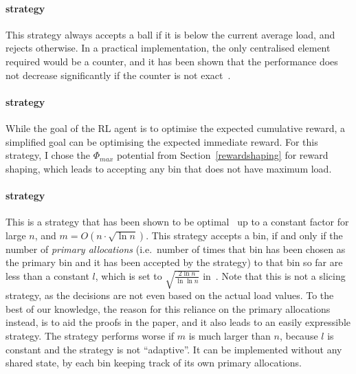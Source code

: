 \paragraph{\MeanThinning strategy}
This strategy always accepts a ball if it is below the current average load, and rejects otherwise. In a practical implementation, the only centralised element required would be a counter, and it has been shown that the performance does not decrease significantly if the counter is not exact~\cite{los2022cachingpackingthinningtwinning}. 


\paragraph{\LocalRewardOptimiser strategy}

While the goal of the RL agent is to optimise the expected cumulative reward, a simplified goal can be optimising the expected immediate reward. For this strategy, I chose the $\Phi_{max}$ potential from Section~\ref{rewardshaping} for reward shaping, which leads to accepting any bin that does not have maximum load.


\paragraph{\Threshold strategy \protect\footnotemark[1]} 



This is a strategy that has been shown to be optimal~\cite{feldheim2021thinning} up to a constant factor for large $n$, and $m = O(n \cdot \sqrt{\ln n})$. This strategy accepts a bin, if and only if the number of \textit{primary allocations} (i.e.\ number of times that bin has been chosen as the primary bin and it has been accepted by the strategy) to that bin so far are less than a constant $l$, which is set to $\sqrt{\frac{2\ln n}{\ln \ln n}}$ in~\cite{feldheim2021thinning}. Note that this is not a slicing strategy, as the decisions are not even based on the actual load values. To the best of our knowledge, the reason for this reliance on the primary allocations instead, is to aid the proofs in the paper, and it also leads to an easily expressible strategy. The strategy performs worse if $m$ is much larger than $n$, because $l$ is constant and the strategy is not ``adaptive''. It can be implemented without any shared state, by each bin keeping track of its own primary allocations.


